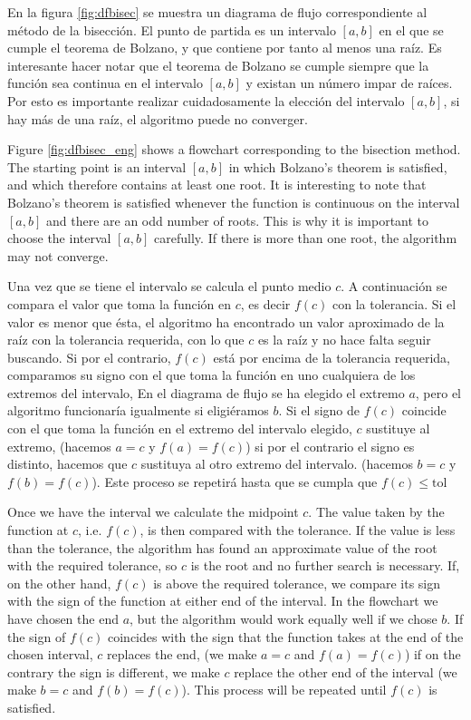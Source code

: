 \begin{paracol}{2}

En la figura \ref{fig:dfbisec} se muestra un diagrama de flujo correspondiente al método de la bisección. El punto de partida es un intervalo $[a,b]$ en el que se cumple el teorema de Bolzano, y que contiene por tanto al menos una raíz. Es interesante hacer notar que el teorema de Bolzano se cumple siempre que la función sea continua en el intervalo $[a,b]$ y existan un número impar de raíces. Por esto es importante realizar cuidadosamente la elección del intervalo $[a,b]$, si hay más de una raíz, el algoritmo puede no converger.

\switchcolumn

Figure \ref{fig:dfbisec_eng} shows a flowchart corresponding to the bisection method. The starting point is an interval $[a,b]$ in which Bolzano's theorem is satisfied, and which therefore contains at least one root. It is interesting to note that Bolzano's theorem is satisfied whenever the function is continuous on the interval $[a,b]$ and there are an odd number of roots. This is why it is important to choose the interval $[a,b]$ carefully. If there is more than one root, the algorithm may not converge.

\switchcolumn
 Una vez que se tiene el intervalo se calcula el punto medio $c$. A continuación se compara el valor que toma la función en $c$, es decir $f(c)$ con la tolerancia. Si el valor es menor que ésta, el algoritmo ha encontrado un valor aproximado de la raíz con la tolerancia requerida, con lo que $c$ es la raíz y no hace falta seguir buscando. Si por el contrario, $f(c)$ está por encima de la tolerancia requerida, comparamos su signo con el que toma la función en uno cualquiera de los extremos del intervalo, En el diagrama de flujo se ha elegido el extremo $a$, pero el algoritmo funcionaría igualmente si eligiéramos $b$. Si el signo de $f(c)$ coincide con el que toma la función en el extremo del intervalo elegido, $c$ sustituye al extremo, (hacemos $a=c$ y $f(a)=f(c)$) si por el contrario el signo es distinto, hacemos que $c$ sustituya al otro extremo del intervalo. (hacemos $b=c$ y $f(b)=f(c)$). Este proceso se repetirá hasta que se cumpla que $f(c)\le \text{tol}$ 

\switchcolumn

 Once we have the interval we calculate the midpoint $c$. The value taken by the function at $c$, i.e. $f(c)$, is then compared with the tolerance. If the value is less than the tolerance, the algorithm has found an approximate value of the root with the required tolerance, so $c$ is the root and no further search is necessary. If, on the other hand, $f(c)$ is above the required tolerance, we compare its sign with the sign of the function at either end of the interval. In the flowchart we have chosen the end $a$, but the algorithm would work equally well if we chose $b$. If the sign of $f(c)$ coincides with the sign that the function takes at the end of the chosen interval, $c$ replaces the end, (we make $a=c$ and $f(a)=f(c)$) if on the contrary the sign is different, we make $c$ replace the other end of the interval (we make $b=c$ and $f(b)=f(c)$). This process will be repeated until $f(c)$ is satisfied. 


\end{paracol}
